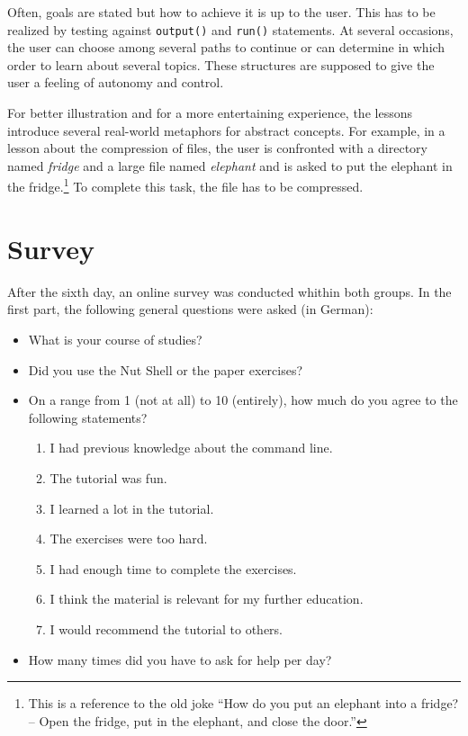\documentclass[paper=a4,twoside,abstract=on,cleardoublepage=empty,numbers=noenddot,toc=bib,12pt,appendixprefix=true]{scrreprt}
\begin{document}
Often, goals are stated but how to achieve it is up to the user. This has to be realized by testing against \texttt{output()} and \texttt{run()} statements. At several occasions, the user can choose among several paths to continue or can determine in which order to learn about several topics. These structures are supposed to give the user a feeling of autonomy and control.

For better illustration and for a more entertaining experience, the lessons introduce several real-world metaphors for abstract concepts. For example, in a lesson about the compression of files, the user is confronted with a directory named \textit{fridge} and a large file named \textit{elephant} and is asked to put the elephant in the fridge.\footnote{This is a reference to the old joke “How do you put an elephant into a fridge? -- Open the fridge, put in the elephant, and close the door.”} To complete this task, the file has to be compressed.

\section{Survey}

After the sixth day, an online survey was conducted whithin both groups. In the first part, the following general questions were asked (in German):

\begin{itemize}
    \item What is your course of studies?
    \item Did you use the Nut Shell or the paper exercises?
    \item On a range from 1 (not at all) to 10 (entirely), how much do you agree to the following statements?
        \begin{enumerate}
            \item I had previous knowledge about the command line.
            \item The tutorial was fun.
            \item I learned a lot in the tutorial.
            \item The exercises were too hard.
            \item I had enough time to complete the exercises.
            \item I think the material is relevant for my further education.
            \item I would recommend the tutorial to others.
        \end{enumerate}
    \item How many times did you have to ask for help per day?
\end{itemize}
\end{document}

